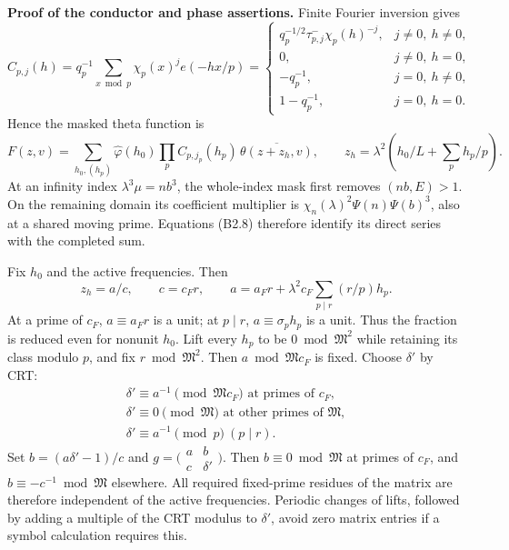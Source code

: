 \documentclass[11pt,a4paper]{article}
\begin{document}
\textbf{Proof of the conductor and phase assertions.} Finite Fourier
inversion gives \[
C_{p,j}(h)=q_p^{-1}\sum_{x\bmod p}\chi_p(x)^j e(-hx/p)
=
\begin{cases}
q_p^{-1/2}\tau_{p,j}^-\chi_p(h)^{-j},&j\ne0,\ h\ne0,\\
0,&j\ne0,\ h=0,\\
-q_p^{-1},&j=0,\ h\ne0,\\
1-q_p^{-1},&j=0,\ h=0.
\end{cases}
\tag{B2.14}
\] Hence the masked theta function is \[
F(z,v)=\sum_{h_0,(h_p)}
\widehat\varphi(h_0)\prod_pC_{p,j_p}(h_p)\,
\overline{\theta(z+z_h,v)},\qquad
z_h=\lambda^2\left(h_0/L+\sum_ph_p/p\right).
\tag{B2.15}
\] At an infinity index \(\lambda^3\mu=nb^3\), the whole-index mask
first removes \((nb,\allowbreak{}E)>1\). On the remaining domain its coefficient
multiplier is \(\chi_n(\lambda)^2\Psi(n)\Psi(b)^3\), also at a shared
moving prime. Equations (B2.8) therefore identify its direct series with
the completed sum.

Fix \(h_0\) and the active frequencies. Then \[
z_h=a/c,\qquad c=c_Fr,\qquad
a=a_Fr+\lambda^2c_F\sum_{p\mid r}(r/p)h_p.
\tag{B2.16}
\] At a prime of \(c_F\), \(a\equiv a_Fr\) is a unit; at \(p\mid r\),
\(a\equiv\sigma_ph_p\) is a unit. Thus the fraction is reduced even for
nonunit \(h_0\). Lift every \(h_p\) to be \(0\bmod\mathfrak M^2\) while
retaining its class modulo \(p\), and fix \(r\bmod\mathfrak M^2\). Then
\(a\bmod\mathfrak Mc_F\) is fixed. Choose \(\delta'\) by CRT: \[
\begin{gathered}
\delta'\equiv a^{-1}\pmod{\mathfrak Mc_F}\text{ at primes of }c_F,\\
\delta'\equiv0\pmod{\mathfrak M}\text{ at other primes of }\mathfrak M,\\
\delta'\equiv a^{-1}\pmod p\ (p\mid r).
\end{gathered}
\] Set \(b=(a\delta'-1)/c\) and
\(g=\bigl(\begin{smallmatrix}a&b\\c&\delta'\end{smallmatrix}\bigr)\).
Then \(b\equiv0\bmod\mathfrak M\) at primes of \(c_F\), and
\(b\equiv-c^{-1}\bmod\mathfrak M\) elsewhere. All required fixed-prime
residues of the matrix are therefore independent of the active
frequencies. Periodic changes of lifts, followed by adding a multiple of
the CRT modulus to \(\delta'\), avoid zero matrix entries if a symbol
calculation requires this.
\end{document}
